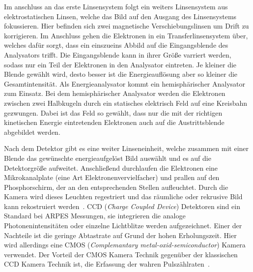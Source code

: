         Im anschluss an das erste Linsensystem folgt ein weiters Linsensystem aus elektrostatischen Linsen, welche das Bild auf den Ausgang des Linsensystems fokussieren.
        Hier befinden sich zwei magnetische Verschiebungslinsen um Drift zu korrigieren.
        Im Anschluss gehen die Elektronen in ein Transferlinsensystem über, welches dafür sorgt, dass ein einszueins Abbild auf die Eingangsblende des Analysators trifft.
        Die Eingangsblende kann in ihrer Größe varriert werden, sodass nur ein Teil der Elektronen in den Analysator eintreten.
        Je kleiner die Blende gewählt wird, desto besser ist die Energieauflösung aber so kleiner die Gesamtintensität.
        Als Energieanalysator kommt ein hemisphärischer Analysator zum Einsatz.
        Bei dem hemisphärischer Analysator werden die Elektronen zwischen zwei Halbkugeln durch ein statisches elektrisch Feld auf eine Kreisbahn gezwungen.
        Dabei ist das Feld so gewählt, dass nur die mit der richtigen kinetischen Energie eintretenden Elektronen auch auf die Austrittsblende abgebildet werden.
        
        Nach dem Detektor gibt es eine weiter Linseneinheit, welche zusammen mit einer Blende das gewünschte energieaufgelöst Bild auswählt und es auf die Detektorgröße aufweitet.
        Anschließend durchlaufen die Elektronen eine Mikrokanalplate (eine Art Elektronenvervielfacher) und prallen auf den Phosphorschirm, der an den entsprechenden Stellen aufleuchtet.
        Durch die Kamera wird dieses Leuchten regestriert und das räumliche oder rekrusive Bild kann rekostruiert werden~\cite{SPECS-MM}.
        CCD (\textit{Charge Coupled Device}) Detektoren sind ein Standard bei ARPES Messungen, sie integrieren die analoge Photonenintensitäten oder einzelne Lichtblitze werden aufgezeichnet.
        Einer der Nachteile ist die geringe Abtastrate auf Grund der hohen Erholungszeit.
        Hier wird allerdings eine CMOS (\textit{Complemantary metal-oxid-semiconductor}) Kamera verwendet.
        Der Vorteil der CMOS Kamera Technik gegenüber der klassischen CCD  Kamera Technik ist, die Erfassung der wahren Pulszählraten~\cite{CMOS}.
        
